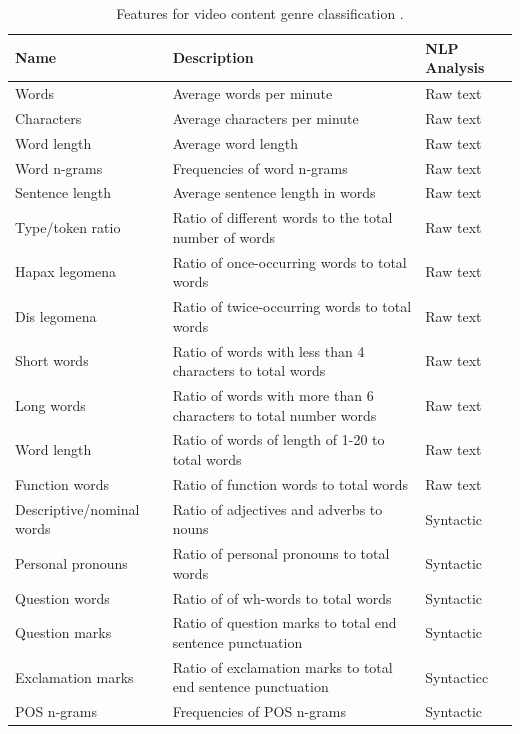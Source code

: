 \begin{table}[t]
	\center
	\caption {Features for video content genre classification  \parencite{lee2017text}.}\label{chap:relevant_work:tbl:videogenre_textbased_special_features}
	\begin{tabular}{p{3cm}p{7cm}p{3cm}}
		\hline
		Name & Description & NLP Analysis \\
		\hline
		Words & Average words per minute & Raw text  \\
        Characters & Average characters per minute & Raw text  \\
        Word length & Average word length & Raw text  \\
        Word n-grams & Frequencies of word n-grams & Raw text \\
        Sentence length & Average sentence length in words & Raw text \\
        Type/token ratio & Ratio of different words to the total number of words & Raw text \\
        Hapax legomena & Ratio of once-occurring words to total words  & Raw text  \\
        Dis legomena & Ratio of twice-occurring words to total words & Raw text  \\
        Short words & Ratio of words with less than 4 characters to total words & Raw text  \\
        Long words & Ratio of words with more than 6 characters to total number words & Raw text \\
        Word length & Ratio of words of length of 1-20 to total words & Raw text \\
        Function words & Ratio of function words to total words  & Raw text \\
        Descriptive/nominal words & Ratio of adjectives and adverbs to nouns & Syntactic \\
        Personal pronouns & Ratio of personal pronouns to total words & Syntactic \\
        Question words & Ratio of of wh-words to total words & Syntactic \\
        Question marks & Ratio of question marks to total end sentence punctuation & Syntactic \\
        Exclamation marks & Ratio of exclamation marks to total end sentence punctuation & Syntacticc \\
        POS n-grams & Frequencies of POS n-grams & Syntactic \\
  		\hline
	\end{tabular}
\end{table}


